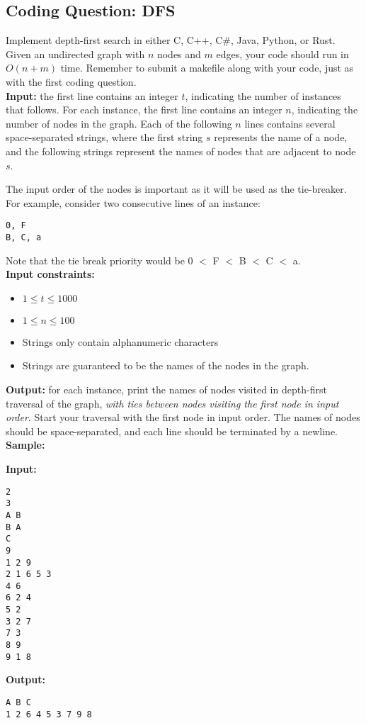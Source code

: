\documentclass[solutionorbox,answers]{exam}
\begin{document}
\begin{questions}
\pagebreak



\section*{Coding Question: DFS}
\question
Implement depth-first search in either C, C++, C\#, Java, Python, or Rust. Given an undirected graph with $n$ nodes and $m$ edges, your code should run in $O(n + m)$ time. Remember to submit a makefile along with your code, just as with the first coding question.\\

\textbf{Input:} the first line contains an integer $t$, indicating the number of instances that follows. For each instance, the first line contains an integer $n$, indicating the number of nodes in the graph. Each of the following $n$ lines contains several space-separated strings, where the first string $s$ represents the name of a node, and the following strings represent the names of nodes that are adjacent to node $s$.

The input order of the nodes is important as it will be used as the tie-breaker. For example, consider two consecutive lines of an instance:
\begin{verbatim}
0, F
B, C, a
\end{verbatim}
Note that the tie break priority would be 0 $<$ F $<$ B $<$ C $<$ a.\\

\textbf{Input constraints:}
\begin{itemize}
    \item $1 \leq t \leq 1000$
    \item $1 \leq n \leq 100$
    \item Strings only contain alphanumeric characters
    \item Strings are guaranteed to be the names of the nodes in the graph.
\end{itemize}

\textbf{Output:} for each instance, print the names of nodes visited in depth-first traversal of the graph, \emph{with ties between nodes visiting the first node in input order}. Start your traversal with the first node in input order. The names of nodes should be space-separated, and each line should be terminated by a newline.\\

\textbf{Sample:}
\begin{multicols}{2}
\textbf{Input:} 
\begin{verbatim}
2
3
A B
B A
C
9
1 2 9
2 1 6 5 3
4 6
6 2 4
5 2
3 2 7
7 3
8 9
9 1 8
\end{verbatim}
\columnbreak
\textbf{Output:} 
\begin{verbatim}
A B C
1 2 6 4 5 3 7 9 8
\end{verbatim}
\end{multicols}


\end{questions}
\end{document}
